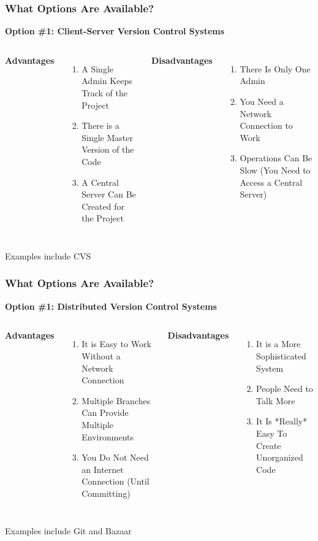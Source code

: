 \begin{frame}
\frametitle{\large{What Options Are Available?}}
\textbf{Option \#1: Client-Server Version Control Systems}
\linebreak
\begin{columns}[c]
\column{2in}
\textbf{Advantages}
\begin{enumerate}
\item A Single Admin Keeps Track of the Project
\item There is a Single Master Version of the Code
\item A Central Server Can Be Created for the Project
\end{enumerate}
\column{2in}
\textbf{Disadvantages}
\begin{enumerate}
\item There Is Only One Admin
\item You Need a Network Connection to Work
\item Operations Can Be Slow (You Need to Access a Central Server)
\end{enumerate}
\end{columns}
\vspace{5mm}
Examples include CVS
\end{frame}

\begin{frame}
\frametitle{\large{What Options Are Available?}}
\textbf{Option \#1: Distributed Version Control Systems}
\linebreak
\begin{columns}[c]
\column{2in}
\textbf{Advantages}
\begin{enumerate}
\item It is Easy to Work Without a Network Connection
\item Multiple Branches Can Provide Multiple Environments
\item You Do Not Need an Internet Connection (Until Committing)
\end{enumerate}
\column{2in}
\textbf{Disadvantages}
\begin{enumerate}
\item It is a More Sophisticated System
\item People Need to Talk More
\item It Is *Really* Easy To Create Unorganized Code 
\end{enumerate}
\end{columns}
\vspace{5mm}
Examples include Git and Bazaar
\end{frame}

